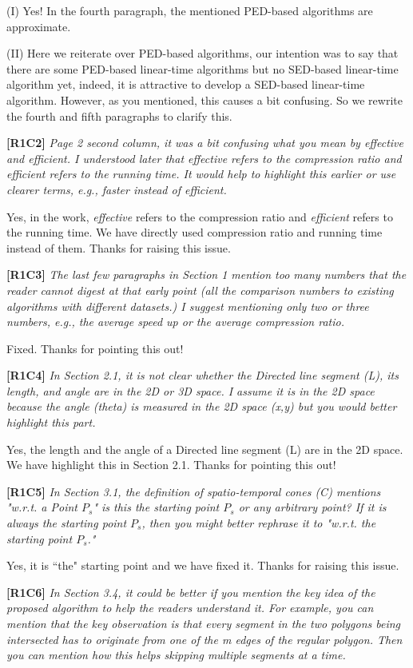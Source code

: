 \documentclass{letter}
\begin{document}
(I) Yes! In the fourth paragraph, the mentioned PED-based algorithms are approximate. 

(II) Here we reiterate over PED-based algorithms, our intention was to say that there are some PED-based linear-time algorithms but no SED-based linear-time algorithm yet, indeed, it is attractive to develop a SED-based linear-time algorithm. However, as you mentioned, this causes a bit confusing. So we rewrite the fourth and fifth paragraphs to clarify this.

\textbf{[R1C2]} \emph{Page 2 second column, it was a bit confusing what you mean by effective and efficient. I understood later that effective refers to the compression ratio and efficient refers to the running time. It would help to highlight this earlier or use clearer terms, e.g., faster instead of efficient.}

Yes, in the work, \emph{effective} refers to the compression ratio and \emph{efficient} refers to the running time. We have directly used compression ratio and running time instead of them. Thanks for raising this issue.

\textbf{[R1C3]} \emph{The last few paragraphs in Section 1 mention too many numbers that the reader cannot digest at that early point (all the comparison numbers to existing algorithms with different datasets.) I suggest mentioning only two or three numbers, e.g., the average speed up or the average compression ratio.}

Fixed. Thanks for pointing this out!

\textbf{[R1C4]} \emph{In Section 2.1, it is not clear whether the Directed line segment (L), its length, and angle are in the 2D or 3D space. I assume it is in the 2D space because the angle (theta) is measured in the 2D space (x,y) but you would better highlight this part.}

Yes, the length and the angle of a Directed line segment (L) are in the 2D space. We have highlight this in Section 2.1. Thanks for pointing this out!

\textbf{[R1C5]} \emph{In Section 3.1, the definition of spatio-temporal cones (C) mentions "w.r.t. a Point $P_s$" is this the starting point $P_s$ or any arbitrary point? If it is always the starting point $P_s$, then you might better rephrase it to "w.r.t. the starting point $P_s$."}

Yes, it is ``the" starting point and we have fixed it. Thanks for raising this issue.

\textbf{[R1C6]} \emph{In Section 3.4, it could be better if you mention the key idea of the proposed algorithm to help the readers understand it. For example, you can mention that the key observation is that every segment in the two polygons being intersected has to originate from one of the m edges of the regular polygon. Then you can mention how this helps skipping multiple segments at a time.}
\end{document}
